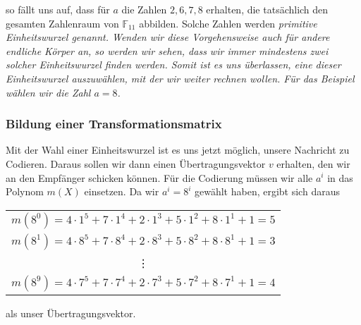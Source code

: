 so fällt uns auf, dass für $a$ die Zahlen $2,6,7,8$ erhalten, die tatsächlich den gesamten Zahlenraum von $\mathbb{F}_{11}$ abbilden. Solche Zahlen werden \em primitive Einheitswurzel \em genannt. 
Wenden wir diese Vorgehensweise auch für andere endliche Körper an, so werden wir sehen, dass wir immer mindestens zwei solcher Einheitswurzel finden werden. Somit ist es uns überlassen, eine dieser Einheitswurzel auszuwählen, mit der wir weiter rechnen wollen. Für das Beispiel wählen wir die Zahl $a = 8$.

\subsubsection{Bildung einer Transformationsmatrix
	\label{reedsolomon:subsection:transMat}}

Mit der Wahl einer Einheitswurzel ist es uns jetzt möglich, unsere Nachricht zu Codieren. Daraus sollen wir dann einen Übertragungsvektor $v$ erhalten, den wir an den Empfänger schicken können. Für die Codierung müssen wir alle $a^i$ in das Polynom $m(X)$ einsetzen. Da wir $a^i = 8^i$ gewählt haben, ergibt sich daraus 
%
%
\begin{center}
	\begin{tabular}{c}
		$m(8^0) = 4 \cdot 1^5 + 7 \cdot 1^4 + 2 \cdot 1^3 + 5 \cdot 1^2 + 8 \cdot 1^1 + 1 = 5$ \\
		$m(8^1) = 4 \cdot 8^5 + 7 \cdot 8^4 + 2 \cdot 8^3 + 5 \cdot 8^2 + 8 \cdot 8^1 + 1 = 3$ \\
		\vdots \\
		$m(8^9) = 4 \cdot 7^5 + 7 \cdot 7^4 + 2 \cdot 7^3 + 5 \cdot 7^2 + 8 \cdot 7^1 + 1 = 4$
	\end{tabular}
\end{center}
als unser Übertragungsvektor. 

